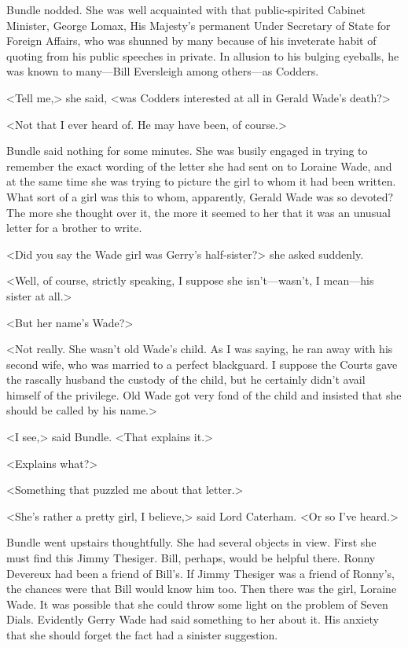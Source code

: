 Bundle nodded. She was well acquainted with that public-spirited Cabinet Minister, George Lomax, His Majesty's permanent Under Secretary of State for Foreign Affairs, who was shunned by many because of his inveterate habit of quoting from his public speeches in private. In allusion to his bulging eyeballs, he was known to many—Bill Eversleigh among others—as Codders.

<Tell me,> she said, <was Codders interested at all in Gerald Wade's death?>

<Not that I ever heard of. He may have been, of course.>

Bundle said nothing for some minutes. She was busily engaged in trying to remember the exact wording of the letter she had sent on to Loraine Wade, and at the same time she was trying to picture the girl to whom it had been written. What sort of a girl was this to whom, apparently, Gerald Wade was so devoted? The more she thought over it, the more it seemed to her that it was an unusual letter for a brother to write.

<Did you say the Wade girl was Gerry's half-sister?> she asked suddenly.

<Well, of course, strictly speaking, I suppose she isn't—wasn't, I mean—his sister at all.>

<But her name's Wade?>

<Not really. She wasn't old Wade's child. As I was saying, he ran away with his second wife, who was married to a perfect blackguard. I suppose the Courts gave the rascally husband the custody of the child, but he certainly didn't avail himself of the privilege. Old Wade got very fond of the child and insisted that she should be called by his name.>

<I see,> said Bundle. <That explains it.>

<Explains what?>

<Something that puzzled me about that letter.>

<She's rather a pretty girl, I believe,> said Lord Caterham. <Or so I've heard.>

Bundle went upstairs thoughtfully. She had several objects in view. First she must find this Jimmy Thesiger. Bill, perhaps, would be helpful there. Ronny Devereux had been a friend of Bill's. If Jimmy Thesiger was a friend of Ronny's, the chances were that Bill would know him too. Then there was the girl, Loraine Wade. It was possible that she could throw some light on the problem of Seven Dials. Evidently Gerry Wade had said something to her about it. His anxiety that she should forget the fact had a sinister suggestion.